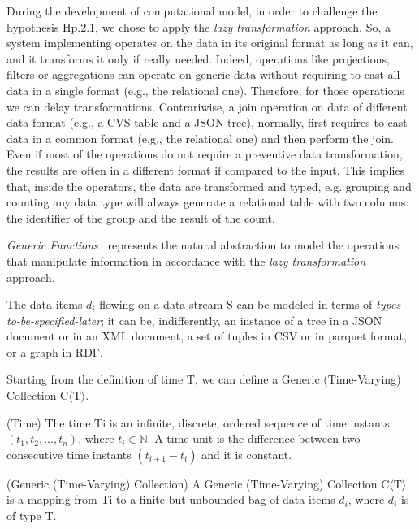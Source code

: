 {During the development of \river{} computational model, in order to challenge the hypothesis \textsf{Hp.2.1}, we chose to apply the \textit{lazy transformation} approach. So, a system implementing \river{} operates on the data in its original format as long as it can, and it transforms it only if really needed. Indeed, operations like projections, filters or aggregations can operate on generic data without requiring to cast all data in a single format (e.g., the relational one). Therefore, for those operations we can delay transformations. Contrariwise, a join operation on data of different data format (e.g., a CVS table and a JSON tree), normally, first requires to cast data in a common format (e.g., the relational one) and then perform the join. Even if most of the operations do not require a preventive data transformation, the results are often in a different format if compared to the input. This implies that, inside the operators, the data are transformed and typed,  e.g. grouping and counting  any data type will always generate a relational table with two columns: the identifier of the group and the result of the count.

\textit{Generic Functions}~\cite{DBLP:conf/dagstuhl/1998gp} represents the natural abstraction to model the operations that manipulate information in accordance with the \textit{lazy transformation} approach. 

The data items $d_i$ flowing on a data stream S can be modeled in terms of \textit{types to-be-specified-later}; it can be, indifferently, an instance of a tree in a JSON document or in an XML document, a set of tuples in CSV or in parquet format, or a graph in RDF.

Starting from the definition of time T, we can define a Generic (Time-Varying) Collection C$\langle\mathrm{T}\rangle$.

\begin{Definition}
(Time) The time $\mathrm{Ti}$ is an infinite, discrete, ordered sequence of time instants $(t_1,t_2,..., t_n)$, where $t_i \in \mathbb{N}$. A time unit is the difference between two consecutive time instants $(t_{i+1} - t_i)$ and it is constant.
\end{Definition}

\begin{Definition}
(Generic (Time-Varying) Collection) A Generic (Time-Varying) Collection C$\langle\mathrm{T}\rangle$ is a mapping from $\mathrm{Ti}$ to a finite but unbounded bag of data items $d_i$, where $d_i$ is of type $\mathrm{T}$. 
\end{Definition}

}

